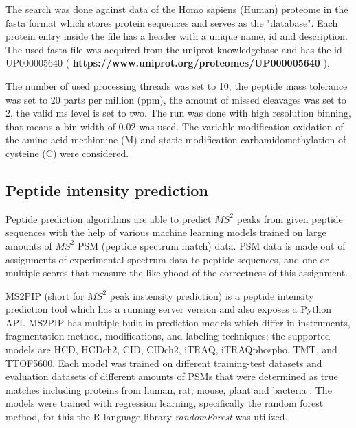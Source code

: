 \documentclass[11pt]{article}
\begin{document}
The search was done against data of the Homo sapiens (Human) proteome in the fasta format which stores protein sequences and serves as the "database". Each protein entry inside the file has a header with a unique name, id and description. The used fasta file was acquired from the uniprot knowledgebase and has the id UP000005640 ( \textbf{https://www.uniprot.org/proteomes/UP000005640} ).

The number of used processing threads was set to 10, the peptide mass tolerance was set to 20 parts per million (ppm), the amount of missed cleavages was set to 2, the valid ms level is set to two. The run was done with high resolution binning, that means a bin width of 0.02 was used. The variable modification oxidation of the amino acid methionine (M) and static modification carbamidomethylation of cysteine (C) were considered.

\subsection{Peptide intensity prediction}
Peptide prediction algorithms are able to predict \(MS^2\) peaks from given peptide sequences with the help of various machine learning models trained on large amounts of \(MS^2\) PSM (peptide spectrum match) data. PSM data is made out of assignments of experimental spectrum data to peptide sequences, and one or multiple scores that measure the likelyhood of the correctness of this assignment.


MS2PIP\cite{ms2pip, ms2pip-server} (short for \(MS^2\) peak instensity prediction) is a peptide intensity prediction tool which has a running server version and also exposes a Python API. MS2PIP has multiple built-in prediction models which differ in instruments, fragmentation method, modifications, and labeling techniques; the supported models are HCD, HCDch2, CID, CIDch2, iTRAQ, iTRAQphospho, TMT, and TTOF5600. Each model was trained on different training-test datasets and evaluation datasets of different amounts of PSMs that were determined as true matches including proteins from human, rat, mouse, plant and bacteria \cite{ms2pip}. The models were trained with regression learning, specifically the random forest method, for this the R language library \textit{randomForest} was utilized.
\end{document}
